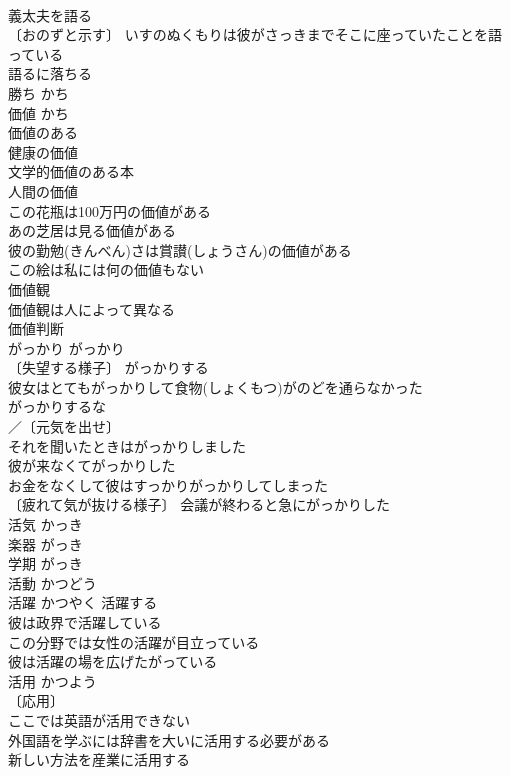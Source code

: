 \documentclass[8pt]{extreport}
\begin{document}
\begin{CJK}{UTF8}{min}
\\	義太夫を語る 
\\	〔おのずと示す〕 いすのぬくもりは彼がさっきまでそこに座っていたことを語っている 
\\	語るに落ちる 
\\	勝ち	かち	
\\	価値	かち	
\\	価値のある 
\\	健康の価値 
\\	文学的価値のある本 
\\	人間の価値 
\\	この花瓶は100万円の価値がある 
\\	あの芝居は見る価値がある 
\\	彼の勤勉(きんべん)さは賞讃(しょうさん)の価値がある 
\\	この絵は私には何の価値もない 
\\	価値観 
\\	価値観は人によって異なる 
\\	価値判断 
\\	がっかり	がっかり	
\\	〔失望する様子〕 がっかりする 
\\	彼女はとてもがっかりして食物(しょくもつ)がのどを通らなかった 
\\	がっかりするな 
\\	／〔元気を出せ〕
\\	それを聞いたときはがっかりしました 
\\	彼が来なくてがっかりした 
\\	お金をなくして彼はすっかりがっかりしてしまった 
\\	〔疲れて気が抜ける様子〕 会議が終わると急にがっかりした 
\\	活気	かっき	
\\	楽器	がっき	
\\	学期	がっき	
\\	活動	かつどう	
\\	活躍	かつやく	活躍する 
\\	彼は政界で活躍している 
\\	この分野では女性の活躍が目立っている 
\\	彼は活躍の場を広げたがっている 
\\	活用	かつよう	
\\	〔応用〕
\\	ここでは英語が活用できない 
\\	外国語を学ぶには辞書を大いに活用する必要がある 
\\	新しい方法を産業に活用する 

\end{CJK}
\end{document}
